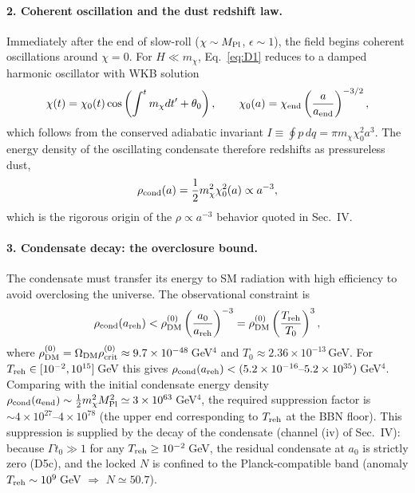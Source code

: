 \documentclass[pdflatex,sn-mathphys-num]{sn-jnl}
\providecommand{\gtrsim}{\geq}
\newcommand{\MP}{M_{\rm Pl}}
\theoremstyle{thmstyleone}
\begin{document}
\begin{appendices}
\paragraph{2. Coherent oscillation and the dust redshift law.} Immediately after the end of slow-roll ($\chi\sim\MP$, $\epsilon\sim1$), the field begins coherent oscillations around $\chi=0$. For $H\ll m_\chi$, Eq.~\eqref{eq:D1} reduces to a damped harmonic oscillator with WKB solution
\begin{equation}
\chi(t)=\chi_0(t)\cos\left(\int^t m_\chi dt'+\theta_0\right),
\qquad
\chi_0(a)=\chi_{\rm end}\left(\frac{a}{a_{\rm end}}\right)^{-3/2},
\label{eq:D3}
\end{equation}
which follows from the conserved adiabatic invariant $I\equiv\oint p\,dq=\pi m_\chi\chi_0^2 a^3$. The energy density of the oscillating condensate therefore redshifts as pressureless dust,
\begin{equation}
\rho_{\rm cond}(a)=\frac12 m_\chi^2\chi_0^2(a)\propto a^{-3},
\label{eq:D4}
\end{equation}
which is the rigorous origin of the $\rho\propto a^{-3}$ behavior quoted in Sec.~IV.

\paragraph{3. Condensate decay: the overclosure bound.} The condensate must transfer its energy to SM radiation with high efficiency to avoid overclosing the universe. The observational constraint is
\begin{equation}
\rho_{\rm cond}(a_{\rm reh})<\rho_{\rm DM}^{(0)}\left(\frac{a_0}{a_{\rm reh}}\right)^{-3}
=\rho_{\rm DM}^{(0)}\left(\frac{T_{\rm reh}}{T_0}\right)^3,
\label{eq:D5}
\end{equation}
where $\rho_{\rm DM}^{(0)}=\Omega_{\rm DM}\rho_{\rm crit}^{(0)}\approx9.7\times10^{-48}\,$GeV$^4$ and $T_0\approx2.36\times10^{-13}\,$GeV. For $T_{\rm reh}\in[10^{-2},10^{15}]\,$GeV this gives $\rho_{\rm cond}(a_{\rm reh})<(5.2\times10^{-16}\text{--}5.2\times10^{35})\,$GeV$^4$. Comparing with the initial condensate energy density $\rho_{\rm cond}(a_{\rm end})\sim\frac12 m_\chi^2\MP^2\simeq3\times10^{63}\,$GeV$^4$, the required suppression factor is $\sim4\times10^{27}$--$4\times10^{78}$ (the upper end corresponding to $T_{\rm reh}$ at the BBN floor). This suppression is supplied by the decay of the condensate (channel (iv) of Sec.~IV): because $\Gamma t_0\gg1$ for any $T_{\rm reh}\gtrsim10^{-2}\,$GeV, the residual condensate at $a_0$ is strictly zero (D5c), and the locked $N$ is confined to the Planck-compatible band (anomaly $T_{\rm reh}\sim10^9\,$GeV $\Rightarrow$ $N\simeq50.7$).


\end{appendices}
\end{document}
